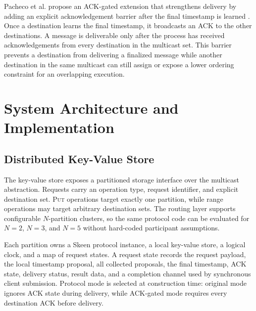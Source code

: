 \documentclass[conference]{IEEEtran}
\begin{document}
Pacheco et al. propose an ACK-gated extension that strengthens delivery by adding an explicit acknowledgement barrier after the final timestamp is learned \cite{pacheco}. Once a destination learns the final timestamp, it broadcasts an \textsc{ACK} to the other destinations. A message is deliverable only after the process has received acknowledgements from every destination in the multicast set. This barrier prevents a destination from delivering a finalized message while another destination in the same multicast can still assign or expose a lower ordering constraint for an overlapping execution.

\section{System Architecture and Implementation}

\subsection{Distributed Key-Value Store}

The key-value store exposes a partitioned storage interface over the multicast abstraction. Requests carry an operation type, request identifier, and explicit destination set. \textsc{Put} operations target exactly one partition, while range operations may target arbitrary destination sets. The routing layer supports configurable $N$-partition clusters, so the same protocol code can be evaluated for $N=2$, $N=3$, and $N=5$ without hard-coded participant assumptions.


Each partition owns a Skeen protocol instance, a local key-value store, a logical clock, and a map of request states. A request state records the request payload, the local timestamp proposal, all collected proposals, the final timestamp, ACK state, delivery status, result data, and a completion channel used by synchronous client submission. Protocol mode is selected at construction time: original mode ignores ACK state during delivery, while ACK-gated mode requires every destination ACK before delivery.
\end{document}
